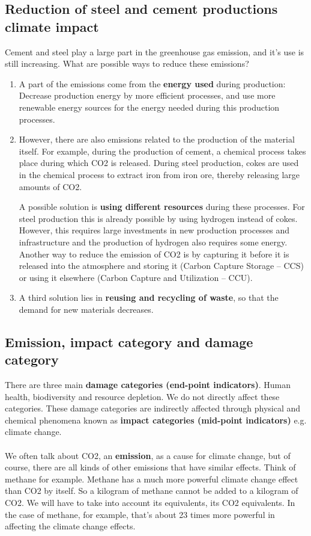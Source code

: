 \documentclass[../summary.tex]{subfiles}
\begin{document}
	\subsection{Reduction of steel and cement productions climate impact}
	
	Cement and steel play a large part in the greenhouse gas emission, and it’s use is still increasing. What are possible ways to reduce these emissions?
	
	\begin{enumerate}
		\item A part of the emissions come from the \textbf{energy used} during production: Decrease production energy by more efficient processes, and use more renewable energy sources for the energy needed during this production processes. 
		\item However, there are also emissions related to the production of the material itself. For example, during the production of cement, a chemical process takes place during which CO2 is released. During steel production, cokes are used in the chemical process to extract iron from iron ore, thereby releasing large amounts of CO2. 
		
		A possible solution is \textbf{using different resources} during these processes. For steel production this is already possible by using hydrogen instead of cokes. However, this requires large investments in new production processes and infrastructure and the production of hydrogen also requires some energy. Another way to reduce the emission of CO2 is by capturing it before it is released into the atmosphere and storing it (Carbon Capture Storage – CCS) or using it elsewhere (Carbon Capture and Utilization – CCU). 
		\item A third solution lies in \textbf{reusing and recycling of waste}, so that the demand for new materials decreases. 
	
	\end{enumerate}
	
	\subsection{Emission, impact category and damage category}
	
	There are three main \textbf{damage categories (end-point indicators)}. Human health, biodiversity and resource depletion. We do not directly affect these categories. These damage categories are indirectly affected through physical and chemical phenomena known as \textbf{impact categories (mid-point indicators)} e.g. climate change. \\
	\\
	We often talk about CO2, an \textbf{emission}, as a cause for climate change, but of course, there are all kinds of other emissions that have similar effects. Think of methane for example. Methane has a much more powerful climate change effect than CO2 by itself. So a kilogram of methane cannot be added to a kilogram of CO2. We will have to take into account its equivalents, its CO2 equivalents. In the case of methane, for example, that's about 23 times more powerful in affecting the climate change effects. 
	
\end{document}
